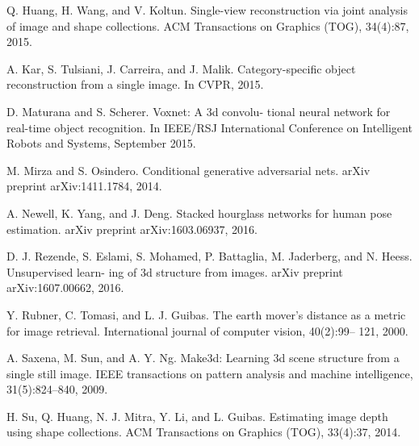 \begin{translationbib}
	\item Q. Huang, H. Wang, and V. Koltun. Single-view reconstruction via joint analysis of image and shape collections. ACM Transactions on Graphics (TOG), 34(4):87, 2015.
	\item A. Kar, S. Tulsiani, J. Carreira, and J. Malik. Category-specific object reconstruction from a single image. In CVPR, 2015.
	\item D. Maturana and S. Scherer. Voxnet: A 3d convolu- tional neural network for real-time object recognition. In IEEE/RSJ International Conference on Intelligent Robots and Systems, September 2015.
	\item M. Mirza and S. Osindero. Conditional generative adversarial nets. arXiv preprint arXiv:1411.1784, 2014.
	\item A. Newell, K. Yang, and J. Deng. Stacked hourglass networks for human pose estimation. arXiv preprint arXiv:1603.06937, 2016.
	\item D. J. Rezende, S. Eslami, S. Mohamed, P. Battaglia, M. Jaderberg, and N. Heess. Unsupervised learn- ing of 3d structure from images. arXiv preprint arXiv:1607.00662, 2016.
	\item Y. Rubner, C. Tomasi, and L. J. Guibas. The earth mover’s distance as a metric for image retrieval. International journal of computer vision, 40(2):99– 121, 2000.
	\item A. Saxena, M. Sun, and A. Y. Ng. Make3d: Learning 3d scene structure from a single still image. IEEE transactions on pattern analysis and machine intelligence, 31(5):824–840, 2009.
	\item H. Su, Q. Huang, N. J. Mitra, Y. Li, and L. Guibas. Estimating image depth using shape collections. ACM Transactions on Graphics (TOG), 33(4):37, 2014.
\end{translationbib}








